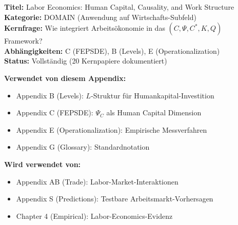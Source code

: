 
\begin{tcolorbox}[colback=blue!5!white, colframe=blue!75!black, title=\textbf{Appendix AA: DOMAIN-LABOR}]
\textbf{Titel:} Labor Economics: Human Capital, Causality, and Work Structure \\
\textbf{Kategorie:} DOMAIN (Anwendung auf Wirtschafts-Subfeld) \\
\textbf{Kernfrage:} Wie integriert Arbeitsökonomie in das $(C, \Psi, C^*, K, Q)$ Framework? \\
\textbf{Abhängigkeiten:} C (FEPSDE), B (Levels), E (Operationalization) \\
\textbf{Status:} Vollständig (20 Kernpapiere dokumentiert)
\end{tcolorbox}

\begin{tcolorbox}[colback=gray!5!white, colframe=gray!75!black, title=\textbf{Cross-Reference Map}]
\small
\textbf{Verwendet von diesem Appendix:}
\begin{itemize}[noitemsep]
    \item Appendix B (Levels): $L$-Struktur für Humankapital-Investition
    \item Appendix C (FEPSDE): $\Psi_C$ als Human Capital Dimension
    \item Appendix E (Operationalization): Empirische Messverfahren
    \item Appendix G (Glossary): Standardnotation
\end{itemize}
\textbf{Wird verwendet von:}
\begin{itemize}[noitemsep]
    \item Appendix AB (Trade): Labor-Market-Interaktionen
    \item Appendix S (Predictions): Testbare Arbeitsmarkt-Vorhersagen
    \item Chapter 4 (Empirical): Labor-Economics-Evidenz
\end{itemize}
\end{tcolorbox}

